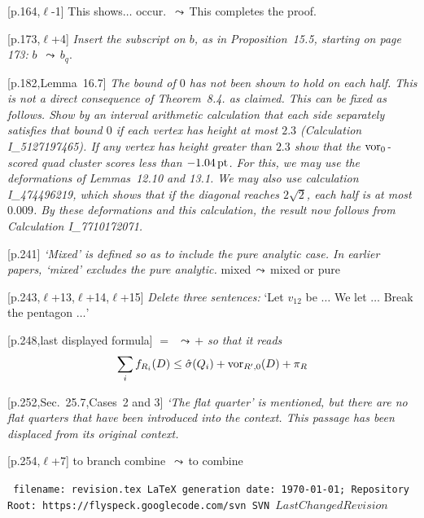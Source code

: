 \documentclass[11pt]{amsart}
\def\svninfo{{\tt
  filename: revision.tex\hfill\break
  LaTeX generation date: \today; \hfill\break
  Repository Root: https://flyspeck.googlecode.com/svn \hfill\break
  SVN $LastChangedRevision$
  }
  }
\def\op#1{{\text{#1}}}
\def\lto{\ensuremath{\,\leadsto\,}}
\def\line{$\ell$}
\def\text{\hbox}
\def\sz{small} %
\begin{document}
\begin{\sz}
[p.164,\line-1] 
	This shows$\ldots$ occur.
	\lto This completes the proof.


[p.173,\line+4] {\it Insert the subscript on $b$,
as in Proposition~15.5, starting on page 173:}
   $b$ \lto $b_q$.



	
[p.182,Lemma~16.7]  {\it The bound of $0$ has not been
shown to hold on each half.  This is not a 
direct consequence
of Theorem~8.4. as claimed.
This can be fixed as follows.  Show by an interval arithmetic
calculation that each side separately satisfies
that bound $0$ if each vertex has height at most $2.3$ (Calculation I\_5127197465).
If any vertex has height greater than $2.3$ show that the $\op{vor}_0$-scored quad cluster scores
less than $-1.04\,\op{pt}$.  
For this, we may use the deformations of Lemmas~12.10 and 13.1.  We may also use calculation I\_474496219, which shows that if the diagonal reaches $2\sqrt2$, each half is at most $0.009$.  
By these deformations and this calculation, the result now follows from Calculation I\_7710172071.}


[p.241]  {\it `Mixed' is defined so as to include
the pure analytic case.  In earlier papers,
`mixed' excludes the pure analytic.  }
	mixed\lto mixed or pure
	
[p.243,\line+13,\line+14,\line+15]
	{\it Delete three sentences:}
	`Let $v_{12}$ be $\ldots$  We let $\ldots$
	 Break the pentagon $\ldots$'
	
[p.248,last displayed formula]  
	$=$ \lto $+$
{\it so that it reads}
	$$
	\sum_i f_{R_i}(D) \le \hat\sigma(Q_i) +
	\op{vor}_{R',0}(D) + \pi_R
	$$

[p.252,Sec.~25.7,Cases~2 and 3]  {\it `The flat quarter'
is mentioned, but there are no flat quarters
that have been introduced into the context.  
This passage
has been displaced from its original context.}

[p.254,\line+7]
to branch combine \lto to combine
\end{\sz}






\bigskip

\begin{\sz}
\svninfo
\end{\sz}
\end{document}
